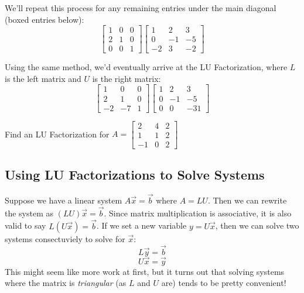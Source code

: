 \documentclass[11pt]{exam}
\begin{document}
    \pagebreak
    We'll repeat this process for any remaining entries under the main diagonal (boxed entries below):
    $$\begin{bmatrix} 1 & 0 & 0 \\ 2 & 1 & 0 \\ 0 & 0 & 1 \end{bmatrix}
      \begin{bmatrix} 1 & 2 & 3 \\ 0 & -1 & -5 \\ \boxed{-2} & \boxed{3} & -2 \end{bmatrix}$$

    Using the same method, we'd eventually arrive at the LU Factorization, where $L$ is the left matrix and $U$ is the right matrix:
    $$\begin{bmatrix} 1 & 0 & 0 \\ 2 & 1 & 0 \\ -2 & -7 & 1 \end{bmatrix}
      \begin{bmatrix} 1 & 2 & 3 \\ 0 & -1 & -5 \\ 0 & 0 & -31 \end{bmatrix}$$

    \begin{questions}
        \item Find an LU Factorization for $A = \begin{bmatrix} 2 & 4 & 2 \\ 1 & 1 & 2 \\ -1 & 0 & 2 \end{bmatrix}$
    \end{questions}

    \vspace{20px}
    \subsection{Using LU Factorizations to Solve Systems}
    Suppose we have a linear system $A \vec{x} = \vec{b}$ where $A = LU$. Then we can rewrite the system as $(LU) \vec{x} = \vec{b}$.
    Since matrix multiplication is associative, it is also valid to say $L(U \vec{x}) = \vec{b}$. If we set a new
    variable $y = U \vec{x}$, then we can solve two systems consectuviely to solve for $\vec{x}$:
    $$L \vec{y} = \vec{b}$$
    $$U \vec{x} = \vec{y}$$
    This might seem like more work at first, but it turns out that solving systems where the matrix is \textit{triangular} (as $L$ and $U$ are)
    tends to be pretty convenient!
\end{document}

